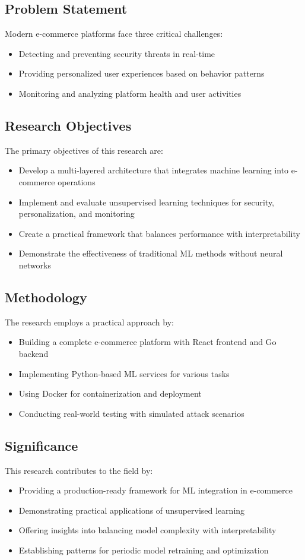 \documentclass[12pt]{article}
\begin{document}
\subsection{Problem Statement}
Modern e-commerce platforms face three critical challenges:
\begin{itemize}
    \item Detecting and preventing security threats in real-time
    \item Providing personalized user experiences based on behavior patterns
    \item Monitoring and analyzing platform health and user activities
\end{itemize}

\subsection{Research Objectives}
The primary objectives of this research are:
\begin{itemize}
    \item Develop a multi-layered architecture that integrates machine learning into e-commerce operations
    \item Implement and evaluate unsupervised learning techniques for security, personalization, and monitoring
    \item Create a practical framework that balances performance with interpretability
    \item Demonstrate the effectiveness of traditional ML methods without neural networks
\end{itemize}

\subsection{Methodology}
The research employs a practical approach by:
\begin{itemize}
    \item Building a complete e-commerce platform with React frontend and Go backend
    \item Implementing Python-based ML services for various tasks
    \item Using Docker for containerization and deployment
    \item Conducting real-world testing with simulated attack scenarios
\end{itemize}

\subsection{Significance}
This research contributes to the field by:
\begin{itemize}
    \item Providing a production-ready framework for ML integration in e-commerce
    \item Demonstrating practical applications of unsupervised learning
    \item Offering insights into balancing model complexity with interpretability
    \item Establishing patterns for periodic model retraining and optimization
\end{itemize}
\end{document}
